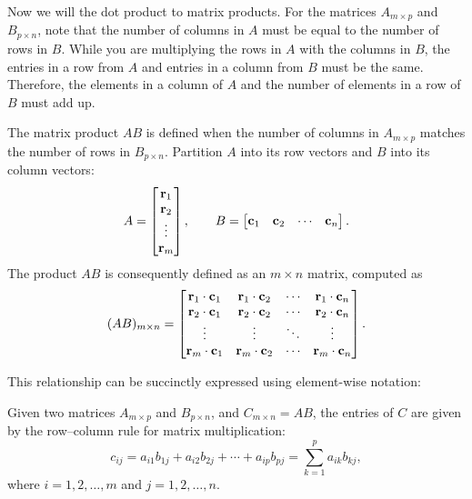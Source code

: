 \documentclass[12pt]{article}
\begin{document}
Now we will the dot product to matrix products. For the matrices $A_{m \times p}$ and $B_{p \times n}$, note that the number of columns in $A$ must be equal to the number of rows in $B$. While you are multiplying the rows in $A$ with the columns in $B$, the entries in a row from $A$ and entries in a column from $B$ must be the same. Therefore, the elements in a column of $A$ and the number of elements in a row of $B$ must add up. 

\begin{definition}
    The matrix product $AB$ is defined when the number of columns in $A_{m \times p}$ matches the number of rows in $B_{p \times n}$. Partition $A$ into its row vectors and $B$ into its column vectors:
    \[
    A =
    \begin{bmatrix}
    \mathbf{r}_{1} \\
    \mathbf{r}_{2} \\
    \vdots   \\
    \mathbf{r}_{m}
    \end{bmatrix},
    \qquad
    B =
    \begin{bmatrix}
    \mathbf{c}_{1} & \mathbf{c}_{2} & \cdots & \mathbf{c}_{n}
    \end{bmatrix}.
    \]
    The product $AB$ is consequently defined as an $m \times n$ matrix, computed as
    \[
    (AB)_{m \times n} =
    \begin{bmatrix}
    \mathbf{r}_{1} \cdot \mathbf{c}_{1} & \mathbf{r}_{1} \cdot \mathbf{c}_{2} & \cdots & \mathbf{r}_{1} \cdot \mathbf{c}_{n} \\
    \mathbf{r}_{2} \cdot \mathbf{c}_{1} & \mathbf{r}_{2} \cdot \mathbf{c}_{2} & \cdots & \mathbf{r}_{2} \cdot \mathbf{c}_{n} \\
    \vdots                    & \vdots                    & \ddots & \vdots                    \\
    \mathbf{r}_{m} \cdot \mathbf{c}_{1} & \mathbf{r}_{m} \cdot \mathbf{c}_{2} & \cdots & \mathbf{r}_{m} \cdot \mathbf{c}_{n}
    \end{bmatrix}.
    \]
\end{definition}

This relationship can be succinctly expressed using element-wise notation:

\begin{theorem}
    Given two matrices $A_{m \times p}$ and $B_{p \times n}$, and $C_{m \times n} = AB$, the entries of $C$ are given by the row–column rule for matrix multiplication:
    \[
    c_{ij} = a_{i1} b_{1j} + a_{i2} b_{2j} + \cdots + a_{ip} b_{pj}
           = \sum_{k=1}^{p} a_{ik} b_{kj},
    \]
    where $i = 1,2,\ldots,m$ and $j = 1,2,\ldots,n$.
\end{theorem}
\end{document}
